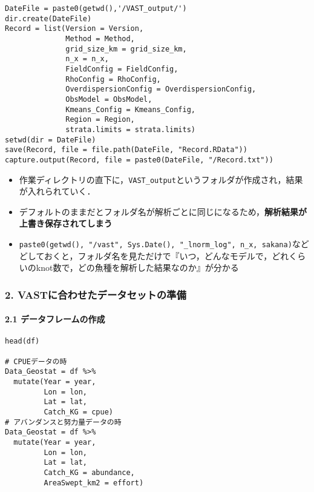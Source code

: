 \documentclass[]{article}
\providecommand{\tightlist}{%
  \setlength{\itemsep}{0pt}\setlength{\parskip}{0pt}}
\let\oldparagraph\paragraph
\renewcommand{\paragraph}[1]{\oldparagraph{#1}\mbox{}}
\begin{document}
\begin{verbatim}
DateFile = paste0(getwd(),'/VAST_output/')
dir.create(DateFile)
Record = list(Version = Version,
              Method = Method,
              grid_size_km = grid_size_km,
              n_x = n_x,
              FieldConfig = FieldConfig,
              RhoConfig = RhoConfig,
              OverdispersionConfig = OverdispersionConfig,
              ObsModel = ObsModel,
              Kmeans_Config = Kmeans_Config,
              Region = Region,
              strata.limits = strata.limits)
setwd(dir = DateFile)
save(Record, file = file.path(DateFile, "Record.RData"))
capture.output(Record, file = paste0(DateFile, "/Record.txt"))
\end{verbatim}

\begin{itemize}
\tightlist
\item
  作業ディレクトリの直下に，\texttt{VAST\_output}というフォルダが作成され，結果が入れられていく．
\item
  デフォルトのままだとフォルダ名が解析ごとに同じになるため，\textbf{解析結果が上書き保存されてしまう}
\item
  \texttt{paste0(getwd(),\ "/vast",\ Sys.Date(),\ "\_lnorm\_log",\ n\_x,\ sakana)}などどしておくと，フォルダ名を見ただけで『いつ，どんなモデルで，どれくらいのknot数で，どの魚種を解析した結果なのか』が分かる
\end{itemize}

\hypertarget{vastux306bux5408ux308fux305bux305fux30c7ux30fcux30bfux30bbux30c3ux30c8ux306eux6e96ux5099}{%
\subsubsection{2.
VASTに合わせたデータセットの準備}\label{vastux306bux5408ux308fux305bux305fux30c7ux30fcux30bfux30bbux30c3ux30c8ux306eux6e96ux5099}}

\hypertarget{ux30c7ux30fcux30bfux30d5ux30ecux30fcux30e0ux306eux4f5cux6210}{%
\paragraph{2.1
データフレームの作成}\label{ux30c7ux30fcux30bfux30d5ux30ecux30fcux30e0ux306eux4f5cux6210}}

\begin{verbatim}
head(df)

# CPUEデータの時
Data_Geostat = df %>%
  mutate(Year = year,
         Lon = lon,
         Lat = lat,
         Catch_KG = cpue)
# アバンダンスと努力量データの時
Data_Geostat = df %>%
  mutate(Year = year,
         Lon = lon,
         Lat = lat,
         Catch_KG = abundance,
         AreaSwept_km2 = effort)
\end{verbatim}
\end{document}
